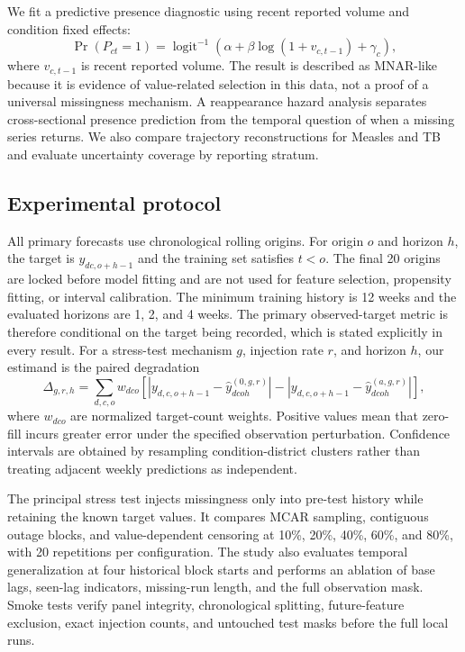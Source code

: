 \documentclass[runningheads]{llncs}
\begin{document}
We fit a predictive presence diagnostic using recent reported volume and condition fixed effects:
\begin{equation}
\Pr(P_{ct}=1)=\operatorname{logit}^{-1}(\alpha+\beta\log(1+v_{c,t-1})+\gamma_c),
\end{equation}
where $v_{c,t-1}$ is recent reported volume. The result is described as MNAR-like because it is evidence of value-related selection in this data, not a proof of a universal missingness mechanism. A reappearance hazard analysis separates cross-sectional presence prediction from the temporal question of when a missing series returns. We also compare trajectory reconstructions for Measles and TB and evaluate uncertainty coverage by reporting stratum.

\subsection{Experimental protocol}\label{sec:protocol}

All primary forecasts use chronological rolling origins. For origin $o$ and horizon $h$, the target is $y_{dc,o+h-1}$ and the training set satisfies $t<o$. The final 20 origins are locked before model fitting and are not used for feature selection, propensity fitting, or interval calibration. The minimum training history is 12 weeks and the evaluated horizons are 1, 2, and 4 weeks. The primary observed-target metric is therefore conditional on the target being recorded, which is stated explicitly in every result. For a stress-test mechanism $g$, injection rate $r$, and horizon $h$, our estimand is the paired degradation
\begin{equation}
\Delta_{g,r,h}=\sum_{d,c,o}w_{dco}\left[\left|y_{d,c,o+h-1}-\hat{y}^{(0,g,r)}_{dcoh}\right|-\left|y_{d,c,o+h-1}-\hat{y}^{(a,g,r)}_{dcoh}\right|\right],
\end{equation}
where $w_{dco}$ are normalized target-count weights. Positive values mean that zero-fill incurs greater error under the specified observation perturbation. Confidence intervals are obtained by resampling condition-district clusters rather than treating adjacent weekly predictions as independent.

The principal stress test injects missingness only into pre-test history while retaining the known target values. It compares MCAR sampling, contiguous outage blocks, and value-dependent censoring at 10\%, 20\%, 40\%, 60\%, and 80\%, with 20 repetitions per configuration. The study also evaluates temporal generalization at four historical block starts and performs an ablation of base lags, seen-lag indicators, missing-run length, and the full observation mask. Smoke tests verify panel integrity, chronological splitting, future-feature exclusion, exact injection counts, and untouched test masks before the full local runs.
\end{document}
